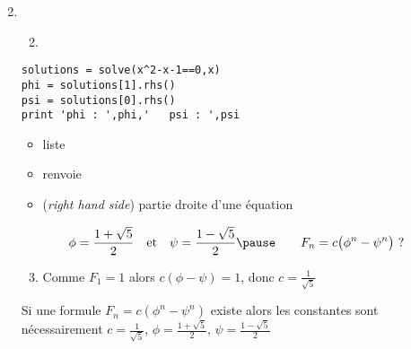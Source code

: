 \begin{frame}[fragile]

\begin{enumerate}\setcounter{enumi}{1}
  \item 
  \begin{enumerate}\setcounter{enumii}{1}
  
    \item ~
    
  \end{enumerate}
  
\begin{algo}
\begin{lstlisting}
solutions = solve(x^2-x-1==0,x)
phi = solutions[1].rhs()
psi = solutions[0].rhs()
print 'phi : ',phi,'   psi : ',psi
\end{lstlisting}
\end{algo}

\pause
  \begin{itemize}
  
    \item liste 
    \pause
    \item {} renvoie 
    \pause
    \item {} (\emph{right hand side}) partie droite d'une équation
  \end{itemize}
\pause
  $$\phi = \frac{1+\sqrt5}{2} \quad \mbox{et}  
  \quad \psi  = \frac{1-\sqrt5}{2}  
  \pause\qquad
  F_n = c  \big(\phi^n-\psi^n\big)\ ?$$
  
  \pause

  \begin{enumerate}\setcounter{enumii}{2}  
    \item Comme $F_1=1$ alors $c(\phi-\psi)=1$, donc $c = \frac{1}{\sqrt 5}$
  \end{enumerate}  
  
\pause
  Si une formule 
  $F_n = c(\phi^n-\psi^n)$ existe alors les constantes sont
  nécessairement $c= \frac{1}{\sqrt 5}$, $\phi = \frac{1+\sqrt5}{2}$, 
  $\psi  = \frac{1-\sqrt5}{2}$
\end{enumerate}  
\end{frame}


